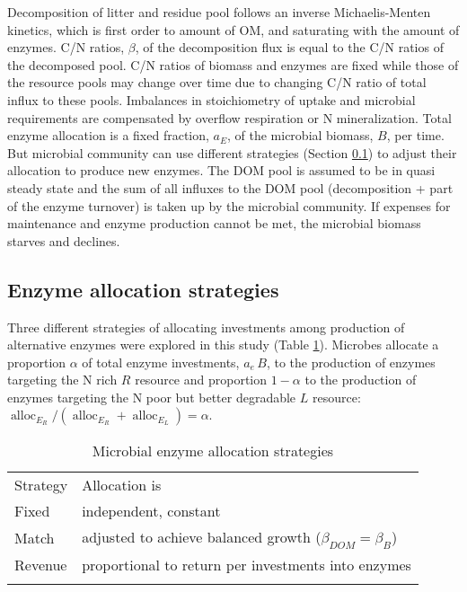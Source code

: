  

Decomposition of litter and residue pool follows an inverse Michaelis-Menten
kinetics, which is first order to amount of OM, and saturating with the amount
of enzymes. C/N ratios, $\beta$, of the decomposition flux is equal to the C/N
ratios of the decomposed pool. C/N ratios of biomass and enzymes are fixed while
those of the resource pools may change over time due to changing C/N ratio of
total influx to these pools. Imbalances in stoichiometry of uptake and microbial
requirements are compensated by overflow respiration or N mineralization.
Total enzyme allocation is a fixed fraction, $a_E$, of the microbial biomass,
$B$, per time. But microbial community can use different strategies (Section
\ref{sec:AllocStrategies}) to adjust their allocation to produce new enzymes.
The DOM pool is assumed to be in quasi steady state and the sum of all
influxes to the DOM pool (decomposition + part of the enzyme turnover) is taken
up by the microbial community. If expenses for maintenance and enzyme production
cannot be met, the microbial biomass starves and declines.

\subsection{ Enzyme allocation strategies} 
\label{sec:AllocStrategies}

Three different strategies of allocating investments among production of
alternative enzymes were explored in this study (Table
\ref{tab:AllocStrategies}). Microbes allocate a proportion $\alpha$ of total
enzyme investments, $a_e\,B$, to the production of enzymes targeting the N rich
$R$ resource and proportion $1 - \alpha$ to the production of enzymes targeting
the N poor but better degradable $L$ resource: $\operatorname{alloc}_{E_R} /
(\operatorname{alloc}_{E_R} + \operatorname{alloc}_{E_L}) = \alpha$.

\begin{table}[t]
\caption{Microbial enzyme allocation strategies \label{tab:AllocStrategies}}
\vskip4mm
\centering
\begin{tabular}{ll}
\tophline
Strategy &  Allocation is \\
\middlehline
Fixed & independent, constant \\
Match & adjusted to achieve balanced growth ($\beta_{DOM} = \beta_{B}$)  \\
Revenue & proportional to return per investments into enzymes \\
\bottomhline
\end{tabular}
\end{table}


